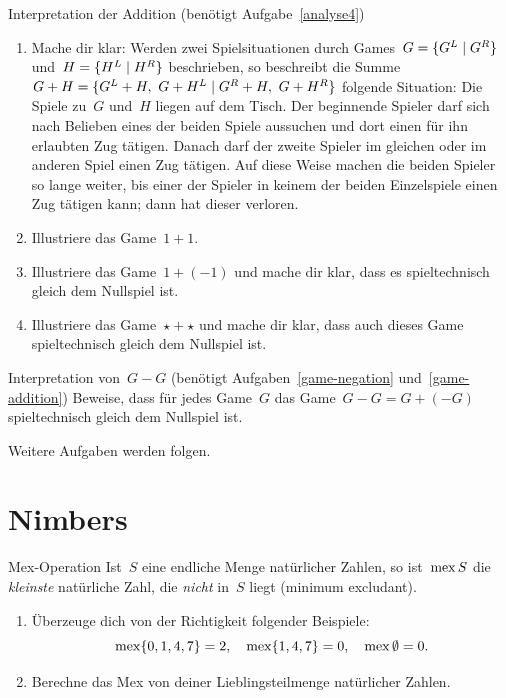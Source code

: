 \documentclass{zirkelblatt}
\newcommand{\head}[1]{\section*{\rmfamily #1}}%
\begin{document}
\begin{aufgabe}{Interpretation der Addition (benötigt Aufgabe~\ref{analyse4})}
\label{game-addition}
\begin{enumerate}
\item Mache dir klar: Werden zwei Spielsituationen durch Games~$G =
\{ G^L \mathrel{|} G^R \}$ und~$H = \{ H^L \mathrel{|} H^R \}$ beschrieben, so beschreibt die Summe~$G
+ H = \{ G^L + H,\ G + H^L \mathrel{|} G^R + H,\ G + H^R \}$ folgende Situation: Die
Spiele zu~$G$ und~$H$ liegen auf dem Tisch. Der beginnende Spieler darf sich
nach Belieben eines der beiden Spiele aussuchen und dort einen für ihn
erlaubten Zug tätigen. Danach darf der zweite Spieler im gleichen oder im
anderen Spiel einen Zug tätigen. Auf diese Weise machen die beiden Spieler so
lange weiter, bis einer der Spieler in keinem der beiden Einzelspiele einen Zug
tätigen kann; dann hat dieser verloren.
\item Illustriere das Game~$1 + 1$.
\item Illustriere das Game~$1 + (-1)$ und mache dir klar, dass es
spieltechnisch gleich dem Nullspiel ist.
\item Illustriere das Game~$\star + \star$ und mache dir klar, dass auch dieses
Game spieltechnisch gleich dem Nullspiel ist.
\end{enumerate}
\end{aufgabe}

\begin{aufgabe}{Interpretation von~$G - G$ (benötigt
Aufgaben~\ref{game-negation} und~\ref{game-addition})}
\label{game-gg}
Beweise, dass für jedes Game~$G$ das Game~$G - G = G + (-G)$ spieltechnisch
gleich dem Nullspiel ist.
\end{aufgabe}

%

Weitere Aufgaben werden folgen.


\head{Nimbers}

\begin{aufgabe}{Mex-Operation}
\label{mex}
Ist~$S$ eine endliche Menge natürlicher Zahlen, so ist~$\operatorname{mex} S$ die \emph{kleinste}
natürliche Zahl, die \emph{nicht} in~$S$ liegt (minimum excludant).
\begin{enumerate}
\item Überzeuge dich von der Richtigkeit folgender Beispiele:
\[
  \operatorname{mex} \{ 0,1,4,7 \} = 2, \quad
  \operatorname{mex} \{ 1,4,7 \} = 0, \quad
  \operatorname{mex} \emptyset = 0. \]
\item Berechne das Mex von deiner Lieblingsteilmenge natürlicher Zahlen.
\end{enumerate}
\end{aufgabe}
\end{document}
